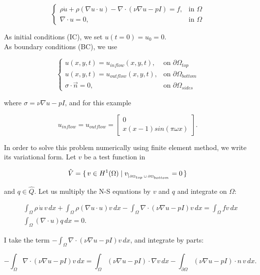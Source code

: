 \documentclass[11pt,a4paper,titlepage]{report}
\begin{document}
\[
\begin{cases}
\rho \dot{u} + \rho (\nabla u \cdot u) - \nabla \cdot (\nu \nabla u - pI) = f, & \mbox{in } \Omega \\
\nabla \cdot u = 0, & \mbox{in } \Omega
\end{cases}
\]

As initial conditions (IC), we set $u(t=0) = u_0 = 0$. \\
As boundary conditions (BC), we use

\[
\begin{cases}
u(x,y,t) = u_{inflow}(x,y,t) , & \mbox{on } \partial \Omega_{top} \\
u(x,y,t) = u_{outflow}(x,y,t) , & \mbox{on } \partial \Omega_{bottom} \\
\sigma \cdot \vec{n} = 0,  & \mbox{on } \partial \Omega_{sides}
\end{cases}
\]

where $\sigma = \nu \nabla u - pI$, and for this example

\begin{equation}
u_{inflow} = u_{outflow} =  \left[ \begin{array}{c} 0 \\ x(x-1)sin(\pi \omega x) \end{array} \right].
\end{equation}

In order to solve this problem numerically using finite element method, we write its variational form. Let $v$ be a test function in

\[
\hat{V} = \set{v \in H^1(\Omega) | v_{|_{\partial \Omega_{top} \, \cup \, \partial \Omega_{bottom}}} = 0}
\]

and $q \in \hat{Q}$. Let us multiply the N-S equations by $v$ and $q$ and integrate on $\Omega$:

\begin{align}
&\int_{\Omega} \rho \, \dot{u} \, v \, dx + \int_{\Omega} \rho (\nabla u \cdot u)v \, dx - \int_{\Omega} \nabla \cdot (\nu \nabla u - pI)v \, dx = \int_{\Omega} fv \, dx \\
&\int_{\Omega} (\nabla \cdot u) q \, dx = 0.
\end{align}

I take the term $- \int_{\Omega} \nabla \cdot (\nu \nabla u - pI)v \, dx$, and integrate by parts:

\[
- \int_{\Omega} \nabla \cdot (\nu \nabla u - pI)v \, dx = \int_{\Omega} (\nu \nabla u - pI) \cdot \nabla v \, dx - \int_{\partial \Omega} (\nu \nabla u - pI) \cdot n \, v \, dx.
\]
\end{document}
